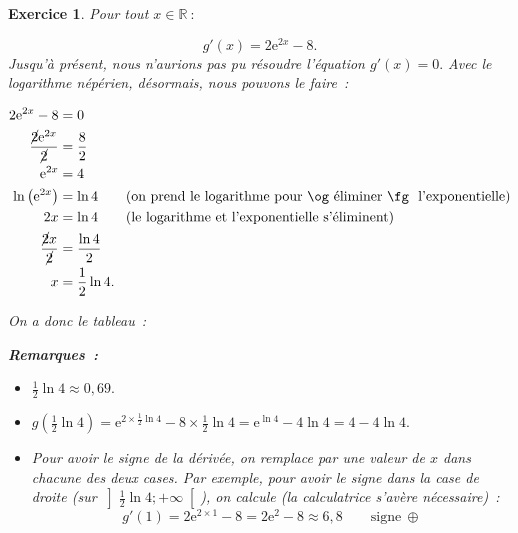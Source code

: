 \documentclass[10pt]{article}
\newtheorem{exo}{Exercice}
\begin{document}
\begin{exo}

Pour tout $x\in\mathbb{R}~:$

\[g'(x)=2\text{e}^{2x}-8.\] Jusqu'à présent, nous n'aurions pas pu résoudre l'équation $g'(x)=0.$ Avec le logarithme népérien, désormais, nous pouvons le faire~:

\begin{align*}
2\text{e}^{2x}-8&=0\\
\frac{\cancel{2}\text{e}^{2x}}{\cancel{2}}&=\frac{8}{2}\\
\text{e}^{2x}&=4\\
\ln\left(\text{e}^{2x}\right)&=\ln 4\qquad\text{(on prend le logarithme pour \og éliminer \fg~{} l'exponentielle)}\\
2x&=\ln 4\qquad \text{(le logarithme et l'exponentielle s'éliminent)}\\
\frac{\cancel{2}x}{\cancel{2}}&=\frac{\ln 4}{2}\\
x&=\frac{1}{2}\ln 4.
\end{align*}

On a donc le tableau~:

\medskip
\begin{center}
\end{center}

\medskip

\textbf{Remarques~:}

\begin{itemize}
\item[\textbullet] $\frac{1}{2}\ln 4 \approx 0,69.$
\item[\textbullet] $g\left(\frac{1}{2}\ln 4\right)=\text{e}^{2\times \frac{1}{2}\ln 4}-8\times \frac{1}{2}\ln 4=\text{e}^{\ln 4}-4\ln 4=4-4\ln 4.$
\item[\textbullet] Pour avoir le signe de la dérivée, on remplace par une valeur de $x$ dans chacune des deux cases. Par exemple, pour avoir le signe dans la case de droite (sur $\left]\frac{1}{2}\ln 4;+\infty\right[$), on calcule (la calculatrice s'avère nécessaire)~:
\[g'(1)=2\text{e}^{2\times 1}-8=2\text{e}^2-8\approx 6,8\qquad \text{signe} ~\oplus\]
\end{itemize}


\end{exo}
\end{document}
